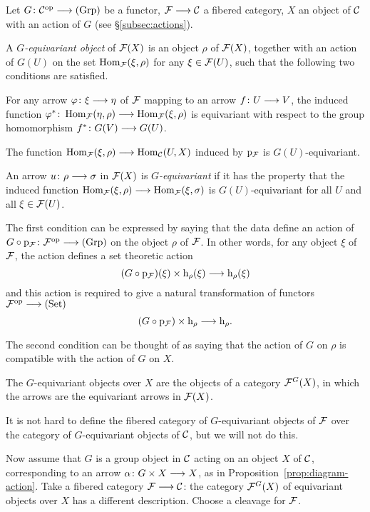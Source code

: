 \begin{3   FIBERED CATEGORIES}
\begin{3.8 Equivariant objects in fibcats}
Let $G \colon \cC\op \arr \catgrp$ be a functor, $\cF \arr \cC$ a fibered category, $X$ an object of $\mathcal{C}$ with an action of $G$ (see \S\ref{subsec:actions}).

\begin{definition}
A \emph{$G$-equivariant object}%
 of $\mathcal{F}(X)$ is an object $\rho$ of $\mathcal{F}(X)$, together with an action of $G(U)$ on the set $\operatorname{Hom}_{\mathcal{F}}(\xi, \rho)$ for any $\xi \in \mathcal{F}(U)$, such that the following two conditions are satisfied.
\begin{enumeratei}

 For any arrow  $\phi \colon \xi \arr \eta$ of $\mathcal{F}$ mapping to an arrow $f \colon U \arr V$, the induced function $\phi^* \colon \hom_{\cF}(\eta, \rho) \arr \hom_{\cF}(\xi, \rho)$ is equivariant with respect to the group homomorphism $f^* \colon G(V) \arr G(U)$.

 The function $ \hom_{\cF}(\xi, \rho) \arr  \hom_{\cC}(U, X)$ induced by $\mathrm{p}_{\mathcal{F}}$ is $G(U)$-equivariant.

\end{enumeratei}
An arrow $u \colon \rho \arr \sigma$ in $\mathcal{F}(X)$ is \emph{$G$-equivariant} if it has the property that the induced function $\hom_{\cF}(\xi, \rho) \arr \hom_{\cF}(\xi, \sigma)$ is $G(U)$-equivariant for all $U$  and all $\xi\in \mathcal{F}(U)$.
\end{definition}

The first condition can be expressed by saying that the data define an action of $G \circ \p_{\cF} \colon \cF\op \arr \catgrp$ on the object $\rho$ of $\mathcal{F}$. In other words, for any object $\xi$ of $\mathcal{F}$, the action defines a set theoretic action
   \[
   (G \circ \p_{\cF})(\xi) \times \h_{\rho}(\xi)
   \arr \h_{\rho}(\xi)
   \]
and this action is required to give a natural transformation of functors $\cF\op \arr \catset$
   \[
   (G \circ \p_{\cF})\times \h_{\rho}
   \arr \h_{\rho}.
   \]

The second condition can be thought of as saying that the action of $G$ on $\rho$ is compatible with the action of $G$ on $X$.

The $G$-equivariant objects over $X$ are the objects of a category $\mathcal{F}^G(X)$, in which the arrows are the equivariant arrows in $\mathcal{F}(X)$. 

It is not hard to define the fibered category of $G$-equivariant objects of $\mathcal{F}$ over the category of $G$-equivariant objects of $\mathcal{C}$, but we will not do this.

Now assume that $G$ is a group object in $\mathcal{C}$ acting on an object $X$ of $\mathcal{C}$, corresponding to  an arrow $\alpha \colon G \times X \arr X$, as in Proposition~\ref{prop:diagram-action}. Take a fibered category $\cF \arr \cC$: the category $\mathcal{F}^{G}(X)$ of equivariant objects over $X$ has a different description. Choose a cleavage for $\mathcal{F}$.


\end{3.8 Equivariant objects in fibcats}
\end{3   FIBERED CATEGORIES}
